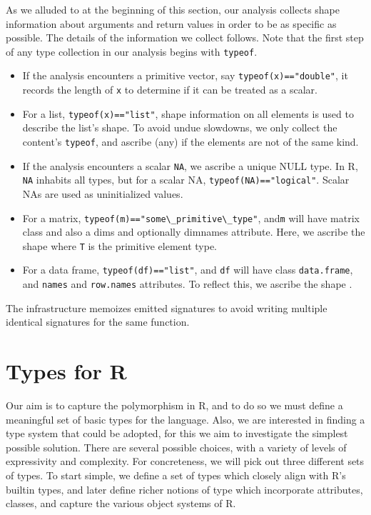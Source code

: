\documentclass[acmsmall,10pt,review,anonymous]{acmart}\settopmatter{printfolios=true,printccs=false,printacmref=false}
\newcommand{\code}[1]{\lstinline|#1|\xspace}
\begin{document}
As we alluded to at the beginning of this section, our analysis collects shape information about
arguments and return values in order to be as specific as possible. The details of the information we collect follows.
Note that the first step of any type collection in our analysis begins with \code{typeof}.

\begin{itemize}
\item If the analysis encounters a primitive vector, say
  \code{typeof(x)=="double"}, it records the length of {\tt x} to determine
  if it can be treated as a scalar.
\item For a list, \code{typeof(x)=="list"}, shape information on all
  elements is used to describe the list's shape.  To avoid undue slowdowns,
  we only collect the content's \code{typeof}, and ascribe \ANY (any) if the
  elements are not of the same kind.
\item If the analysis encounters a scalar \code{NA}, we ascribe a unique
  NULL type.  In R, \code{NA} inhabits all types, but for a scalar NA,
  \code{typeof(NA)=="logical"}. Scalar NAs are used as uninitialized values.
\item For a matrix, \code{typeof(m)=="some\_primitive\_type"}, and\code{m} will have matrix class and also a dims and
  optionally dimnames attribute. Here, we ascribe the shape 
  where {\tt T} is the primitive element type.
\item For a data frame, \code{typeof(df)=="list"}, and \code{df} will have class {\tt data.frame}, and {\tt names} and {\tt row.names} attributes.
 To reflect this, we ascribe the shape .
\end{itemize}

The infrastructure memoizes emitted signatures to avoid writing multiple
identical signatures for the same function.

\section{Types for R}

Our aim is to capture the polymorphism in R, and to do so we must define a
meaningful set of basic types for the language. Also, we are interested in
finding a type system that could be adopted, for this we aim to investigate
the simplest possible solution.  There are several possible choices, with a
variety of levels of expressivity and complexity.  For concreteness, we will
pick out three different sets of types.  To start simple, we define a set of
types which closely align with R's builtin types, and later define richer
notions of type which incorporate attributes, classes, and capture the
various object systems of R.
\end{document}
